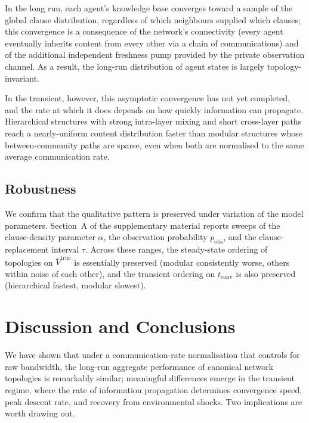 \documentclass{article}
\begin{document}
In the long run, each agent's knowledge base converges toward a sample of the global clause distribution, regardless of which neighbours supplied which clauses; this convergence is a consequence of the network's connectivity (every agent eventually inherits content from every other via a chain of communications) and of the additional independent freshness pump provided by the private observation channel. As a result, the long-run distribution of agent states is largely topology-invariant.

In the transient, however, this asymptotic convergence has not yet completed, and the rate at which it does depends on how quickly information can propagate. Hierarchical structures with strong intra-layer mixing and short cross-layer paths reach a nearly-uniform content distribution faster than modular structures whose between-community paths are sparse, even when both are normalised to the same average communication rate.

\subsection{Robustness}

We confirm that the qualitative pattern is preserved under variation of the model parameters. Section~A of the supplementary material reports sweeps of the clause-density parameter $\alpha$, the observation probability $p_{\text{obs}}$, and the clause-replacement interval $\tau$. Across these ranges, the steady-state ordering of topologies on $\bar V^{\text{true}}$ is essentially preserved (modular consistently worse, others within noise of each other), and the transient ordering on $t_{\text{conv}}$ is also preserved (hierarchical fastest, modular slowest).


\section{Discussion and Conclusions}\label{sec:conclusion}

We have shown that under a communication-rate normalisation that controls for raw bandwidth, the long-run aggregate performance of canonical network topologies is remarkably similar; meaningful differences emerge in the transient regime, where the rate of information propagation determines convergence speed, peak descent rate, and recovery from environmental shocks. Two implications are worth drawing out.
\end{document}
